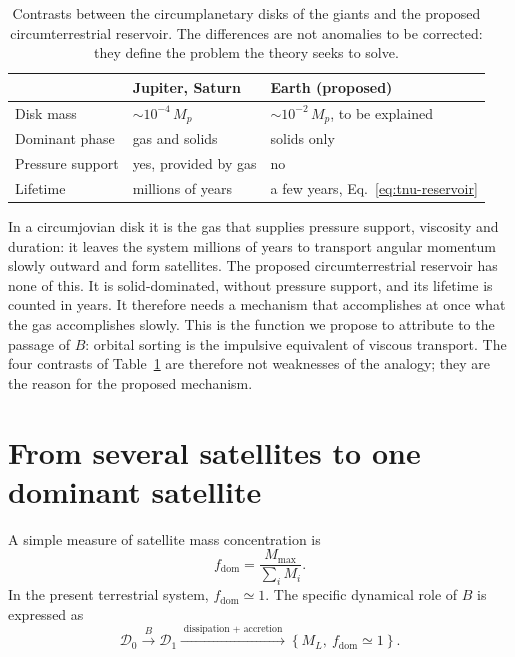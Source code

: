 \documentclass[11pt,a4paper,openany]{report}
\begin{document}
\begin{table}[htbp]
\centering
\small
\caption{Contrasts between the circumplanetary disks of the giants and the proposed
circumterrestrial reservoir. The differences are not anomalies to be corrected: they define the
problem the theory seeks to solve.}
\label{tab:contraste-disques}
\begin{tabularx}{\textwidth}{>{\raggedright\arraybackslash}p{4.2cm}
>{\raggedright\arraybackslash}X >{\raggedright\arraybackslash}X}
\toprule
 & \textbf{Jupiter, Saturn} & \textbf{Earth (proposed)} \\
\midrule
Disk mass & $\sim10^{-4}\,M_p$ & $\sim10^{-2}\,M_p$, to be explained \\[3pt]
Dominant phase & gas and solids & solids only \\[3pt]
Pressure support & yes, provided by gas & no \\[3pt]
Lifetime & millions of years & a few years, Eq.~\eqref{eq:tnu-reservoir} \\
\bottomrule
\end{tabularx}
\end{table}

\begin{ideephys}
In a circumjovian disk it is the gas that supplies pressure support, viscosity and duration: it
leaves the system millions of years to transport angular momentum slowly outward and form
satellites. The proposed circumterrestrial reservoir has none of this. It is solid-dominated,
without pressure support, and its lifetime is counted in years. It therefore needs a mechanism that
accomplishes at once what the gas accomplishes slowly. This is the function we propose to attribute
to the passage of $B$: orbital sorting is the impulsive equivalent of viscous transport. The four
contrasts of Table~\ref{tab:contraste-disques} are therefore not weaknesses of the analogy; they are
the reason for the proposed mechanism.
\end{ideephys}

\section{From several satellites to one dominant satellite}

A simple measure of satellite mass concentration is
\begin{equation}
f_{\mathrm{dom}}=\frac{M_{\max}}{\sum_i M_i}.
\label{eq:fdom}
\end{equation}
In the present terrestrial system, $f_{\mathrm{dom}}\simeq1$. The specific dynamical role of $B$ is
expressed as
\begin{equation}
\mathcal{D}_0\xrightarrow{\;B\;}\mathcal{D}_1
\xrightarrow{\;\text{dissipation + accretion}\;}\left\{M_L,\ f_{\mathrm{dom}}\simeq1\right\}.
\label{eq:roleB}
\end{equation}
\end{document}

